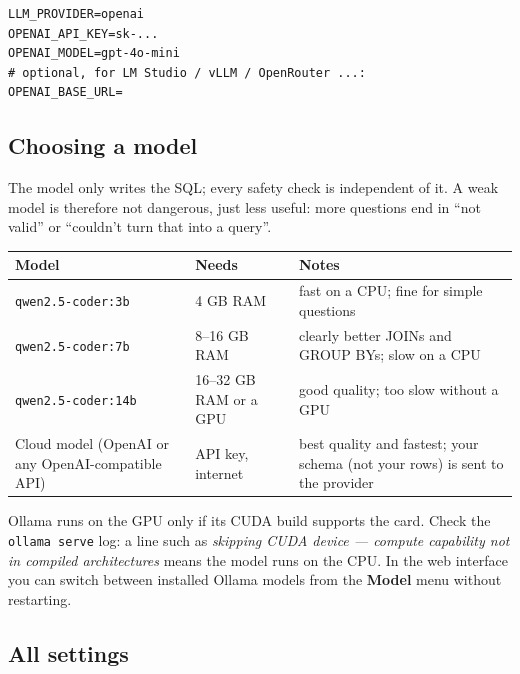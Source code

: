 \documentclass[11pt,a4paper]{article}
\begin{document}
\begin{lstlisting}
LLM_PROVIDER=openai
OPENAI_API_KEY=sk-...
OPENAI_MODEL=gpt-4o-mini
# optional, for LM Studio / vLLM / OpenRouter ...:
OPENAI_BASE_URL=
\end{lstlisting}

\subsection{Choosing a model}

The model only writes the SQL; every safety check is independent of it. A
weak model is therefore not dangerous, just less useful: more questions end
in ``not valid'' or ``couldn't turn that into a query''.

\begin{center}
\begin{tabular}{@{}p{4.2cm}p{3.2cm}p{7cm}@{}}
\toprule
\textbf{Model} & \textbf{Needs} & \textbf{Notes} \\
\midrule
\texttt{qwen2.5-coder:3b}  & 4 GB RAM  & fast on a CPU; fine for simple questions \\
\texttt{qwen2.5-coder:7b}  & 8--16 GB RAM & clearly better JOINs and GROUP BYs; slow on a CPU \\
\texttt{qwen2.5-coder:14b} & 16--32 GB RAM or a GPU & good quality; too slow without a GPU \\
Cloud model (OpenAI or any OpenAI-compatible API) & API key, internet & best quality and fastest; your schema (not your rows) is sent to the provider \\
\bottomrule
\end{tabular}
\end{center}

Ollama runs on the GPU only if its CUDA build supports the card. Check the
\texttt{ollama serve} log: a line such as \emph{skipping CUDA device ---
compute capability not in compiled architectures} means the model runs on
the CPU. In the web interface you can switch between installed Ollama
models from the \textbf{Model} menu without restarting.

\subsection{All settings}
\end{document}
